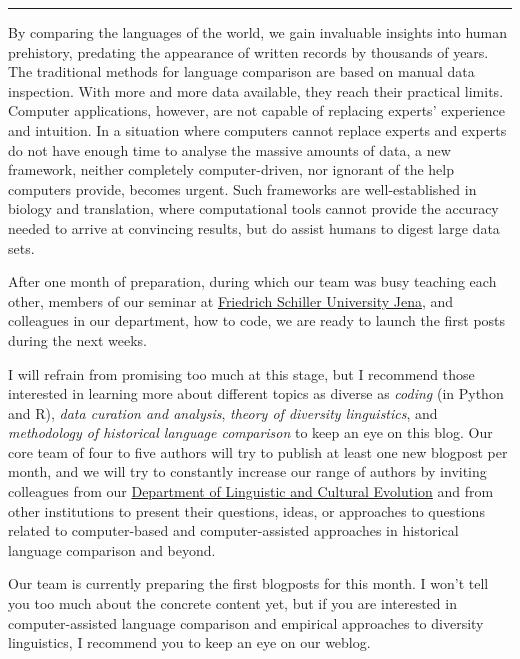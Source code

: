\documentclass[
  english,
  a4paper,
  oneside,tablecaptionabove
]{scrbook}
\begin{document}
\begin{center}\rule{0.5\linewidth}{\linethickness}\end{center}

By comparing the languages of the world, we gain invaluable insights
into human prehistory, predating the appearance of written records by
thousands of years. The traditional methods for language comparison are
based on manual data inspection. With more and more data available, they
reach their practical limits. Computer applications, however, are not
capable of replacing experts' experience and intuition. In a situation
where computers cannot replace experts and experts do not have enough
time to analyse the massive amounts of data, a new framework, neither
completely computer-driven, nor ignorant of the help computers provide,
becomes urgent. Such frameworks are well-established in biology and
translation, where computational tools cannot provide the accuracy
needed to arrive at convincing results, but do assist humans to digest
large data sets.

After one month of preparation, during which our team was busy teaching
each other, members of our seminar at
\href{http://calc.digling.org/seminar/}{Friedrich Schiller University
Jena}, and colleagues in our department, how to code, we are ready to
launch the first posts during the next weeks.

I will refrain from promising too much at this stage, but I recommend
those interested in learning more about different topics as diverse as
\emph{coding} (in Python and R), \emph{data curation and analysis},
\emph{theory of diversity linguistics}, and \emph{methodology of
historical language comparison} to keep an eye on this blog. Our core
team of four to five authors will try to publish at least one new
blogpost per month, and we will try to constantly increase our range of
authors by inviting colleagues from our
\href{http://www.shh.mpg.de/DLCE-Forschungsueberblick}{Department of
Linguistic and Cultural Evolution} and from other institutions to
present their questions, ideas, or approaches to questions related to
computer-based and computer-assisted approaches in historical language
comparison and beyond.

Our team is currently preparing the first blogposts for this month. I
won't tell you too much about the concrete content yet, but if you are
interested in computer-assisted language comparison and empirical
approaches to diversity linguistics, I recommend you to keep an eye on
our weblog.
\end{document}
